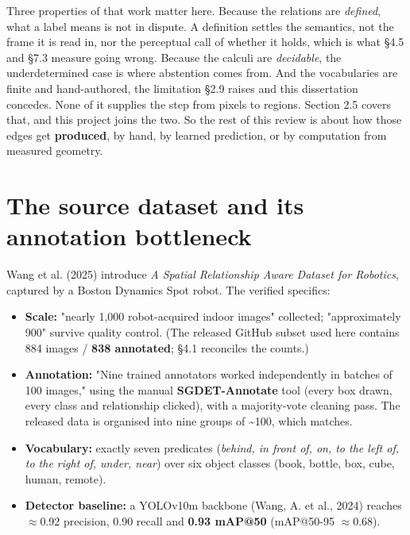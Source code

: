 Three properties of that work matter here. Because the relations are \textit{defined}, what a label means is not in dispute. A definition settles the semantics, not the frame it is read in, nor the perceptual call of whether it holds, which is what \S{}4.5 and \S{}7.3 measure going wrong. Because the calculi are \textit{decidable}, the underdetermined case is where abstention comes from. And the vocabularies are finite and hand-authored, the limitation \S{}2.9 raises and this dissertation concedes. None of it supplies the step from pixels to regions. Section 2.5 covers that, and this project joins the two. So the rest of this review is about how those edges get \textbf{produced}, by hand, by learned prediction, or by computation from measured geometry.

\section{The source dataset and its annotation bottleneck}

Wang et al. (2025) introduce \textit{A Spatial Relationship Aware Dataset for Robotics}, captured by a Boston Dynamics Spot robot. The verified specifics:

\begin{itemize}
\item \textbf{Scale:} "nearly 1,000 robot-acquired indoor images" collected; "approximately 900" survive quality control. (The released GitHub subset used here contains 884 images / \textbf{838 annotated}; \S{}4.1 reconciles the counts.)
\item \textbf{Annotation:} "Nine trained annotators worked independently in batches of 100 images," using the manual \textbf{SGDET-Annotate} tool (every box drawn, every class and relationship clicked), with a majority-vote cleaning pass. The released data is organised into nine groups of \textasciitilde{}100, which matches.
\item \textbf{Vocabulary:} exactly seven predicates (\textit{behind, in front of, on, to the left of, to the right of, under, near}) over six object classes (book, bottle, box, cube, human, remote).
\item \textbf{Detector baseline:} a YOLOv10m backbone (Wang, A. et al., 2024) reaches $\approx$0.92 precision, 0.90 recall and \textbf{0.93 mAP@50} (mAP@50-95 $\approx$0.68).
\end{itemize}

